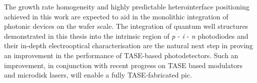The growth rate homogeneity and highly predictable heterointerface positioning achieved in this work are expected to aid in the monolithic integration of photonic devices on the wafer scale. The integration of quantum well structures demonstrated in this thesis into the intrinsic region of \textit{p} - \textit{i} - \textit{n} photodiodes and their in-depth electrooptical characterisation are the natural next step in proving an improvement in the performance of \acs{TASE}-based photodetectors. Such an improvement, in conjunction with recent progress on \acs{TASE} based modulators and microdisk lasers, will enable a fully \acs{TASE}-fabricated \acs{pic}.